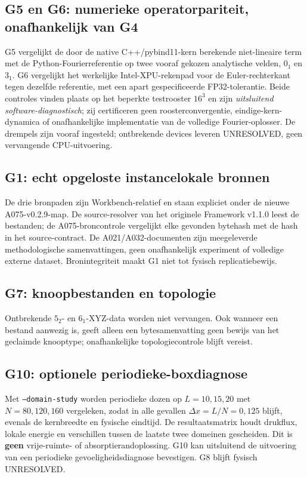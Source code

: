 \documentclass[10pt,a4paper]{article}
\begin{document}
\subsection{G5 en G6: numerieke operatorpariteit, onafhankelijk van G4}
G5 vergelijkt de door de native C++/pybind11-kern berekende niet-lineaire term
met de Python-Fourierreferentie op twee vooraf gekozen analytische velden,
$0_1$ en $3_1$. G6 vergelijkt het werkelijke Intel-XPU-rekenpad voor de
Euler-rechterkant tegen dezelfde referentie, met een apart gespecificeerde
FP32-tolerantie. Beide controles vinden plaats op het beperkte testrooster
$16^3$ en zijn \emph{uitsluitend software-diagnostisch}; zij certificeren geen
roosterconvergentie, eindige-kern-dynamica of onafhankelijke implementatie
van de volledige Fourier-oplosser. De drempels zijn vooraf ingesteld;
ontbrekende devices leveren UNRESOLVED, geen vervangende CPU-uitvoering.
\subsection{G1: echt opgeloste instancelokale bronnen}
De drie bronpaden zijn Workbench-relatief en staan expliciet onder de nieuwe
A075-v0.2.9-map. De source-resolver van het originele Framework v1.1.0 leest
de bestanden; de A075-broncontrole vergelijkt elke gevonden bytehash met
de hash in het source-contract. De A021/A032-documenten zijn meegeleverde
methodologische samenvattingen, geen onafhankelijk experiment of volledige
externe dataset. Bronintegriteit maakt G1 niet tot fysisch replicatiebewijs.
\subsection{G7: knoopbestanden en topologie}
Ontbrekende $5_2$- en $6_1$-XYZ-data worden niet vervangen. Ook wanneer een
bestand aanwezig is, geeft alleen een bytesamenvatting geen bewijs van het
geclaimde knooptype; onafhankelijke topologiecontrole blijft vereist.
\subsection{G10: optionele periodieke-boxdiagnose}
Met \texttt{--domain-study} worden periodieke dozen op $L=10,15,20$
met $N=80,120,160$ vergeleken, zodat in alle gevallen
$\Delta x=L/N=0{,}125$ blijft, evenals de kernbreedte en fysische eindtijd.
De resultaatsmatrix houdt drukflux, lokale energie en verschillen tussen
de laatste twee domeinen gescheiden. Dit is \textbf{geen} vrije-ruimte-
of absorptierandoplossing. G10 kan uitsluitend de uitvoering van een
periodieke gevoeligheidsdiagnose bevestigen. G8 blijft fysisch UNRESOLVED.
\end{document}
